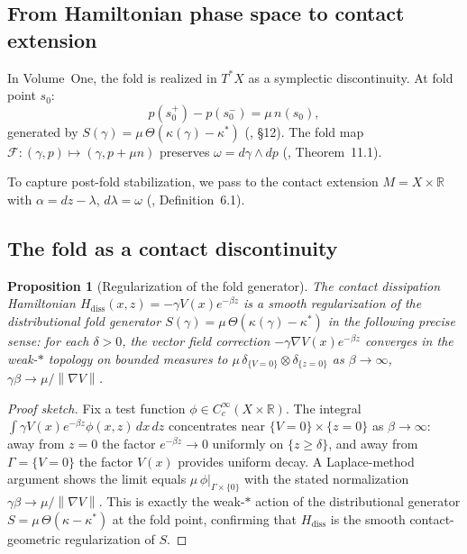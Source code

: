 \documentclass[12pt]{article}
\numberwithin{equation}{section}
\newtheorem{proposition}[theorem]{Proposition}
\theoremstyle{remark}
\newcommand{\R}{\mathbb{R}}
\newcommand{\Orb}{\Gamma}
\newcommand{\norm}[1]{\left\|#1\right\|}
\begin{document}
\subsection{From Hamiltonian phase space to contact extension}

In Volume~One, the fold is realized in $T^*X$ as a symplectic
discontinuity. At fold point $s_0$:
\[
  p(s_0^+) - p(s_0^-) = \mu\,n(s_0),
\]
generated by $S(\gamma) = \mu\,\Theta(\kappa(\gamma)-\kappa^*)$
(\cite{PO1}, \S12). The fold map
$\mathcal{F}:(\gamma,p)\mapsto(\gamma,p+\mu n)$
preserves $\omega = d\gamma\wedge dp$
(\cite{PO1}, Theorem~11.1).

To capture post-fold stabilization, we pass to the contact
extension $M = X\times\R$ with $\alpha = dz - \lambda$,
$d\lambda=\omega$ (\cite{Paper1}, Definition~6.1).

\subsection{The fold as a contact discontinuity}

\begin{proposition}[Regularization of the fold generator]
\label{prop:regularization}
The contact dissipation Hamiltonian
$H_{\mathrm{diss}}(x,z) = -\gamma V(x)e^{-\beta z}$
is a smooth regularization of the distributional fold generator
$S(\gamma) = \mu\,\Theta(\kappa(\gamma)-\kappa^*)$
in the following precise sense: for each $\delta>0$, the
vector field correction $-\gamma\nabla V(x)e^{-\beta z}$
converges in the weak-$*$ topology on bounded measures to
$\mu\,\delta_{\{V=0\}}\otimes\delta_{\{z=0\}}$ as
$\beta\to\infty$, $\gamma\beta\to\mu/\norm{\nabla V}$.
\end{proposition}

\begin{proof}[Proof sketch]
Fix a test function $\phi\in C_c^\infty(X\times\R)$.
The integral $\int \gamma V(x)e^{-\beta z}\phi(x,z)\,dx\,dz$
concentrates near $\{V=0\}\times\{z=0\}$ as $\beta\to\infty$:
away from $z=0$ the factor $e^{-\beta z}\to 0$ uniformly on
$\{z\ge\delta\}$, and away from $\Orb=\{V=0\}$ the factor
$V(x)$ provides uniform decay. A Laplace-method argument shows
the limit equals $\mu\,\phi|_{\Orb\times\{0\}}$ with the
stated normalization $\gamma\beta\to\mu/\norm{\nabla V}$.
This is exactly the weak-$*$ action of the distributional
generator $S = \mu\,\Theta(\kappa-\kappa^*)$ at the fold
point, confirming that $H_{\mathrm{diss}}$ is the smooth
contact-geometric regularization of $S$.
\end{proof}
\end{document}
